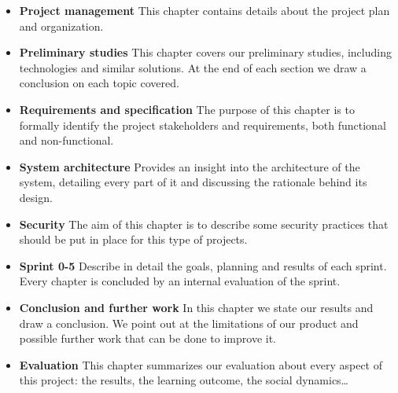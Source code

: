 \begin{itemize}
	\item \textbf{Project management}\newline
		This chapter contains details about the project plan and organization.
	\item \textbf{Preliminary studies}\newline
		This chapter covers our preliminary studies, including technologies
		and similar solutions. At the end of each section we draw a conclusion
		on each topic covered.
	\item \textbf{Requirements and specification}\newline
		The purpose of this chapter is to formally identify the project stakeholders
		and requirements, both functional and non-functional.
	\item \textbf{System architecture}\newline
		Provides an insight into the architecture of the system,
		detailing every part of it and discussing the rationale behind its design.
	\item \textbf{Security}\newline
		The aim of this chapter is to describe some security practices that
		should be put in place for this type of projects.
	\item \textbf{Sprint 0-5}\newline
		Describe in detail the goals, planning and results of each sprint.
		Every chapter is concluded by an internal evaluation of the sprint.
	\item \textbf{Conclusion and further work}\newline
		In this chapter we state our results and draw a conclusion.
		We point out at the limitations of our product and possible further work
		that can be done to improve it.
	\item \textbf{Evaluation}\newline
		This chapter summarizes our evaluation about every aspect of this project:
		the results, the learning outcome, the social dynamics\ldots
\end{itemize}
